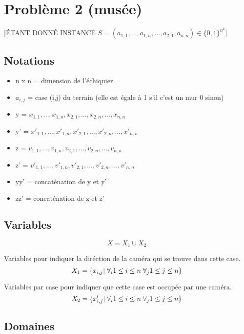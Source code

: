 \documentclass[a4paper,11pt]{article}
\begin{document}
\section {Problème 2 (musée)}
[ÉTANT DONNÉ INSTANCE $S = (a_{1,1},\dots,a_{1,n},\dots,a_{2,1},a_{n,n}) \in \{0,1\}^{n^2}$]

\subsection{Notations}
\begin{itemize}
\item n x n = dimension de l'échiquier
\item $a_{i,j}$ = case (i,j) du terrain (elle est égale à 1 s'il c'est un mur 0 sinon)
\item y = $x_{1,1},\ldots, x_{1,n},x_{2,1}, \ldots,x_{2,n}, \ldots, x_{n,n} $
\item y' = $x'_{1,1},\ldots, x'_{1,n},x'_{2,1}, \ldots,x'_{2,n}, \ldots, x'_{n,n} $
\item z = $v_{1,1},\ldots, v_{1,n},v_{2,1}, \ldots,v_{2,n}, \ldots, v_{n,n} $
\item z' = $v'_{1,1},\ldots, v'_{1,n},v'_{2,1}, \ldots,v'_{2,n}, \ldots, v'_{n,n} $
\item yy' = concaténation de y et y'
\item zz' = concaténation de z et z'

\end{itemize}

\subsection{Variables}

$$X = X_1 \cup X_2$$

Variables pour indiquer la diréction de la caméra qui se trouve dans cette case.
$$X_1 = \{x_{i,j} | \hspace{0.1cm} \forall_{i} 1 \leq i \leq n \hspace{0.1cm} \forall_{j} 1 \leq j \leq n\}$$

Variables par case pour indiquer que cette case est occupée par une caméra.
$$X_2 = \{x'_{i,j} | \hspace{0.1cm} \forall_{i} 1 \leq i \leq n \hspace{0.1cm} \forall_{j} 1 \leq j \leq n\}$$

\subsection{Domaines}
\end{document}

